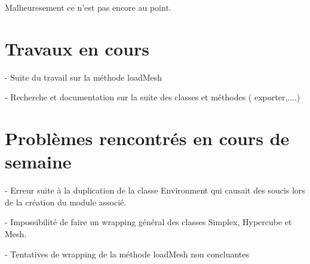 \documentclass[12pt]{article}
\begin{document}
Malheuresement ce n'est pas encore au point.
\section{Travaux en cours}
- Suite du travail sur la méthode loadMesh

- Recherche et documentation sur la suite des classes et méthodes ( exporter,....)

\section{Problèmes rencontrés en cours de semaine}
- Erreur suite à la duplication de la classe Environment qui causait des soucis lors de la création du module associé.

- Impossibilité de faire un wrapping général des classes Simplex, Hypercube et Mesh.

- Tentatives de wrapping de la méthode loadMesh non concluantes
\end{document}
